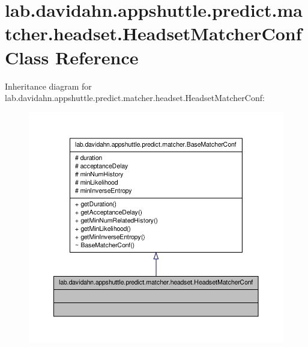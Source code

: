 \hypertarget{classlab_1_1davidahn_1_1appshuttle_1_1predict_1_1matcher_1_1headset_1_1_headset_matcher_conf}{\section{lab.\-davidahn.\-appshuttle.\-predict.\-matcher.\-headset.\-Headset\-Matcher\-Conf \-Class \-Reference}
\label{classlab_1_1davidahn_1_1appshuttle_1_1predict_1_1matcher_1_1headset_1_1_headset_matcher_conf}
}


\-Inheritance diagram for lab.\-davidahn.\-appshuttle.\-predict.\-matcher.\-headset.\-Headset\-Matcher\-Conf\-:
\nopagebreak
\begin{figure}[H]
\begin{center}
\leavevmode
\includegraphics[width=350pt]{classlab_1_1davidahn_1_1appshuttle_1_1predict_1_1matcher_1_1headset_1_1_headset_matcher_conf__inherit__graph}
\end{center}
\end{figure}


